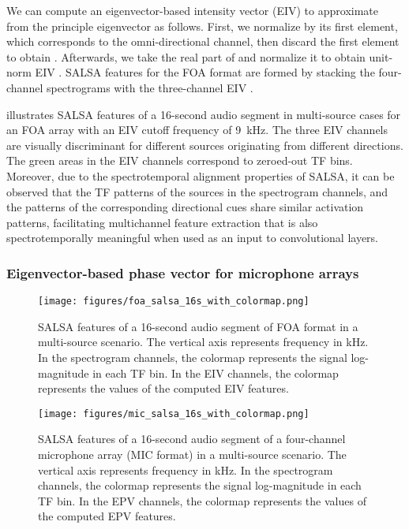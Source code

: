 \documentclass[journal]{IEEEtran}
\begin{document}
We can compute an eigenvector-based intensity vector (EIV) to approximate  from the principle eigenvector  as follows. First, we normalize  by its first element, which corresponds to the omni-directional channel, then discard the first element to obtain . Afterwards, we take the real part of  and normalize it to obtain unit-norm EIV . SALSA features for the FOA format are formed by stacking the four-channel spectrograms with the three-channel EIV . 

 illustrates SALSA features of a \num{16}-second audio segment in multi-source cases for an FOA array with an EIV cutoff frequency of \SI{9}{\kilo\hertz}. The three EIV channels are visually discriminant for different sources originating from different directions. The green areas in the EIV channels correspond to zeroed-out TF bins. Moreover, due to the spectrotemporal alignment properties of SALSA, it can be observed that the TF patterns of the sources in the spectrogram channels, and the patterns of the corresponding directional cues share similar activation patterns, facilitating multichannel feature extraction that is also spectrotemporally meaningful when used as an input to convolutional layers.

\subsubsection{Eigenvector-based phase vector for microphone arrays}
\label{subsec:epv}

\begin{figure}[tb]
    \centering
    \texttt{[image: figures/foa\_salsa\_16s\_with\_colormap.png]}
    \vspace{-0.5cm}
    \caption{SALSA features of a 16-second audio segment of FOA format in a multi-source scenario. 
    The vertical axis represents frequency in kHz. In the spectrogram channels, the colormap represents the signal log-magnitude in each TF bin. In the EIV channels, the colormap represents the values of the computed EIV features.}
    \label{fig:foa_salsa}
\end{figure} 

\begin{figure}[tb]
    \centering
    \texttt{[image: figures/mic\_salsa\_16s\_with\_colormap.png]}
    \vspace{-0.5cm}
    \caption{SALSA features of a 16-second audio segment of a four-channel microphone array (MIC format) in a multi-source scenario. The vertical axis represents frequency in kHz. In the spectrogram channels, the colormap represents the signal log-magnitude in each TF bin. In the EPV channels, the colormap represents the values of the computed EPV features.}
    \label{fig:mic_salsa}
\end{figure} 
\end{document}
